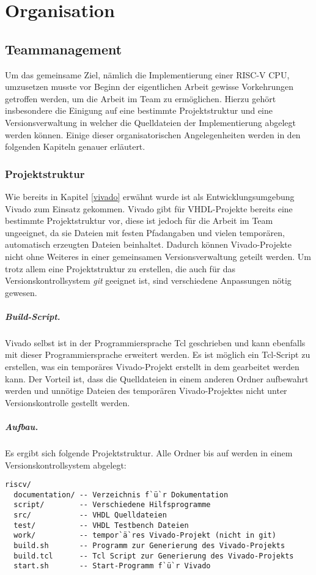 \chapter{Organisation} 
\label{organisation} 

\section{Teammanagement}
Um das gemeinsame Ziel, nämlich die Implementierung einer RISC-V CPU,
umzusetzen musste vor Beginn der eigentlichen Arbeit gewisse
Vorkehrungen getroffen werden, um die Arbeit im Team zu ermöglichen.
Hierzu gehört insbesondere die Einigung auf eine bestimmte
Projektstruktur und eine Versionsverwaltung in welcher die Quelldateien
der Implementierung abgelegt werden können. Einige dieser
organisatorischen Angelegenheiten werden in den folgenden Kapiteln 
genauer erläutert. 

\subsection{Projektstruktur}
Wie bereits in Kapitel \ref{vivado} erwähnt wurde ist als
Entwicklungsumgebung Vivado zum Einsatz gekommen. Vivado gibt für
VHDL-Projekte bereits eine bestimmte Projektstruktur vor, diese ist
jedoch für die Arbeit im Team ungeeignet, da sie Dateien mit festen 
Pfadangaben  und vielen temporären, automatisch erzeugten Dateien
beinhaltet. Dadurch können Vivado-Projekte nicht ohne Weiteres in einer
gemeinsamen Versionsverwaltung geteilt werden. Um trotz allem eine
Projektstruktur zu erstellen, die auch für das Versionskontrollsystem
\emph{git} geeignet ist, sind verschiedene Anpassungen nötig gewesen.

\paragraph{Build-Script.}  
Vivado selbst ist in der Programmiersprache Tcl geschrieben und kann
ebenfalls mit dieser Programmiersprache erweitert werden. Es ist möglich
ein Tcl-Script zu erstellen, was ein temporäres Vivado-Projekt erstellt
in dem gearbeitet werden kann. Der Vorteil ist, dass die Quelldateien in
einem anderen Ordner aufbewahrt werden und unnötige Dateien des
temporären Vivado-Projektes nicht unter Versionskontrolle gestellt werden.

\paragraph{Aufbau.} Es ergibt sich folgende Projektstruktur. Alle Ordner
bis auf  werden in einem Versionskontrollsystem abgelegt:
\begin{lstlisting}[inputencoding={utf8},extendedchars=false,escapeinside=``]
riscv/
  documentation/ -- Verzeichnis f`ü`r Dokumentation
  script/        -- Verschiedene Hilfsprogramme 
  src/           -- VHDL Quelldateien 
  test/          -- VHDL Testbench Dateien 
  work/          -- tempor`ä`res Vivado-Projekt (nicht in git) 
  build.sh       -- Programm zur Generierung des Vivado-Projekts
  build.tcl      -- Tcl Script zur Generierung des Vivado-Projekts
  start.sh       -- Start-Programm f`ü`r Vivado 
\end{lstlisting}


